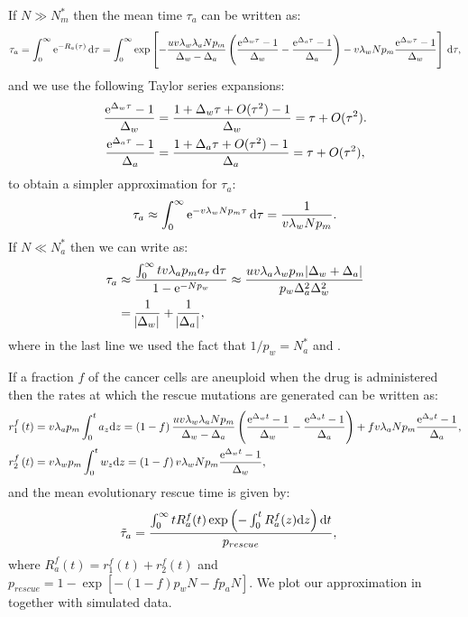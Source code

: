 \documentclass[12pt]{extarticle}
\renewcommand{\d}[1]{\ensuremath{\operatorname{d}\!{#1}}}
\renewcommand{\d}{{\rm d}}
\newcommand{\e}{{\rm e}}
\begin{document}
\begin{appendices}
If $N\gg N_m^*$ then the mean time $\tau_a$ can be written as:
\begin{align*}
\tau_a=\int_0^\infty\e^{-R_a\left(\tau\right)}\,\d\tau=\int_0^\infty\exp\left[-\frac{uv\lambda_w\lambda_aNp_m}{\Delta_w-\Delta_a}\left(\frac{\e^{\Delta_w\tau}-1}{\Delta_w}-\frac{\e^{\Delta_a\tau}-1}{\Delta_a}\right)-v\lambda_wNp_m\frac{\e^{\Delta_w\tau}-1}{\Delta_w}\right]\,\d\tau,
\end{align*}
and we use the following Taylor series expansions:
\begin{align*}
\frac{\e^{\Delta_w\tau}-1}{\Delta_w}&=\frac{1+\Delta_w\tau+O(\tau^2)-1}{\Delta_w}=\tau+O(\tau^2).\\
\frac{\e^{\Delta_a\tau}-1}{\Delta_a}&=\frac{1+\Delta_a\tau+O(\tau^2)-1}{\Delta_a}=\tau+O(\tau^2),
\end{align*}
to obtain a simpler approximation for $\tau_a$:
\begin{align}\label{limitapprox3}
\tau_a\approx\int_0^\infty\e^{-v\lambda_wNp_m\tau}\,\d\tau=\frac{1}{v\lambda_wNp_m}.
\end{align}
If $N\ll N_a^*$ then we can write  as:
\begin{align}\nonumber
\tau_a&\approx\frac{\int_0^\infty tv\lambda_ap_ma_\tau\,\d\tau}{1-\e^{-Np_w}}\approx\frac{uv\lambda_a\lambda_wp_m\abs{\Delta_w+\Delta_a}}{p_w\Delta_a^2\Delta_w^2}\\ \label{limitapprox4}
&=\frac{1}{\abs{\Delta_w}}+\frac{1}{\abs{\Delta_a}},
\end{align}
where in the last line we used the fact that $1/p_w=N_a^*$ and .

If a fraction $f$ of the cancer cells are aneuploid when the drug is administered then the rates at which the rescue mutations are generated can be written as:
\begin{align*}
r_1^f\left(t\right)&=v\lambda_ap_m\int_0^ta_{z} \d z = \left(1-f\right)\frac{uv\lambda_w\lambda_aNp_m}{\Delta_w-\Delta_a}\left(\frac{\e^{\Delta_wt}-1}{\Delta_w}-\frac{\e^{\Delta_at}-1}{\Delta_a}\right)+fv\lambda_aNp_m\frac{\e^{\Delta_a t}-1}{\Delta_a},\\ 
r_2^f\left(t\right)&=v\lambda_wp_m\int_0^tw_{z} \d z = \left(1-f\right)v\lambda_wNp_m\frac{\e^{\Delta_w t}-1}{\Delta_w},
\end{align*} 
and the mean evolutionary rescue time is given by:
\begin{align}\label{meantimet2SGV}
\tilde{\tau}_a&= \frac{\int_{0}^{\infty}{tR_a^f(t)\exp\left(-\int_0^{t}{R_a^f(z)\d z}\right) \d t}}{p_{rescue}},
\end{align}
where $R_a^f(t)=r_1^f\left(t\right)+r_2^f\left(t\right)$ and $p_{rescue}=1-\exp\left[-\left(1-f\right)p_wN-fp_aN\right]$. We plot our approximation in   together with simulated data.


\end{appendices}
\end{document}

